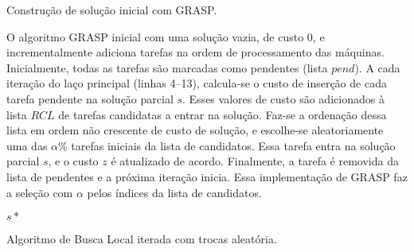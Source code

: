 \documentclass[12pt]{article}
\begin{document}
\begin{algorithm}[H]
   \footnotesize
   \caption{Construção de solução inicial com GRASP.}
   \label{algo:GRASP}
\end{algorithm}

O algoritmo GRASP inicial com uma solução vazia, de custo 0, e incrementalmente
adiciona tarefas na ordem de processamento das máquinas. Inicialmente, todas as
tarefas são marcadas como pendentes (lista $\mathit{pend}$). A cada iteração do 
laço principal
(linhas 4--13), calcula-se o custo de inserção de cada tarefa pendente
na solução parcial $s$. Esses valores de custo são adicionados à
lista $\mathit{RCL}$ de tarefas candidatas a entrar na solução. Faz-se a
ordenação dessa lista em ordem não crescente de custo de solução,
e escolhe-se aleatoriamente uma das $\alpha$\% tarefas iniciais da lista de
candidatos. Essa tarefa entra na solução parcial $s$, e o custo $z$ é
atualizado de acordo. Finalmente, a tarefa é removida da lista de pendentes e
a próxima iteração inicia. Essa implementação de GRASP faz a seleção com
$\alpha$ pelos índices da lista de candidatos.

\begin{algorithm}[H]
   \footnotesize
   \Return $s*$
   \caption{Algoritmo de Busca Local iterada com trocas aleatória.}
   \label{algo:LS}
\end{algorithm}
\end{document}
